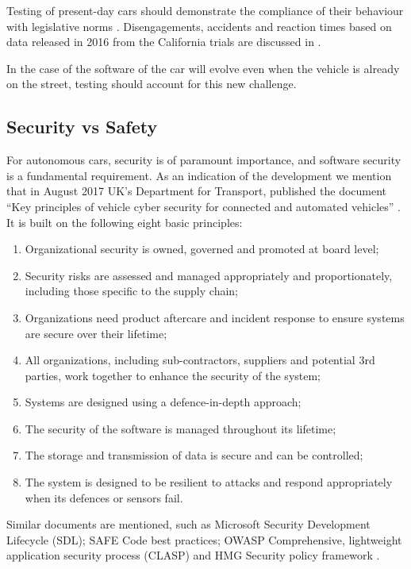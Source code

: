 Testing of present-day cars should demonstrate the compliance of their behaviour with legislative norms \cite{DepartmentofMotorVehiclesStateofCalifornia}. Disengagements, accidents and reaction times based on data released in 2016 from the California trials are discussed in \cite{10.1371/journal.pone.0168054}.

In the case of the software of the car will evolve even when the vehicle is already on the street, testing should account for this new challenge.



\subsection{Security vs Safety}
\label{sec:EAofTC:SecurityVSSafety}

For autonomous cars, security is of paramount importance, and software security is a fundamental requirement. As an indication of the development we mention that in August 2017 UK's Department for Transport, published the document \enquote{Key principles of vehicle cyber security for connected and automated vehicles} \cite{DepartmentforTransportDfT2017}. It is built on the following eight basic principles:

\begin{enumerate}
\item Organizational security is owned, governed and promoted at board level;
\item Security risks are assessed and managed appropriately and proportionately, including those specific to the supply chain;
\item Organizations need product aftercare and incident response to ensure systems are secure over their lifetime;
\item All organizations, including sub-contractors, suppliers and potential 3rd parties, work together to enhance the security of the system;
\item Systems are designed using a defence-in-depth approach;
\item The security of the software is managed throughout its lifetime;
\item The storage and transmission of data is secure and can be controlled;
\item The system is designed to be resilient to attacks and respond appropriately when its defences or sensors fail.
\end{enumerate}

Similar documents are mentioned, such as Microsoft Security Development Lifecycle (SDL); SAFE Code best practices; OWASP Comprehensive, lightweight application security process (CLASP) and HMG Security policy framework \cite{DepartmentforTransportDfT2017}.

